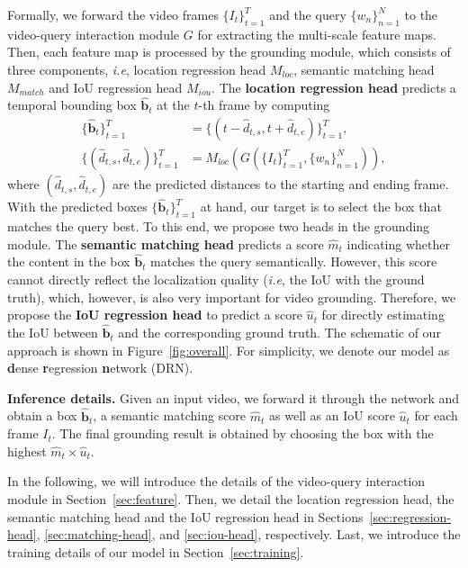 \documentclass[10pt,twocolumn,letterpaper]{article}
\def\ie{\emph{i.e}\onedot} \def\Ie{\emph{I.e}\onedot}
\begin{document}
	
Formally, we forward the video frames $\{I_{t}\}_{t=1}^T$ and the query $\{w_n\}_{n=1}^{N}$ to the video-query interaction module $G$ for extracting the multi-scale feature maps. Then, each  feature map is processed by the grounding module, which consists of three components, \ie, location regression head $M_{loc}$, semantic matching head $M_{match}$ and IoU regression head $M_{iou}$. The \textbf{location regression head} predicts a temporal bounding box $\hat{\mathbf{b}}_{t}$ at the $t$-th frame by computing
	\begin{equation}\label{eq:general}
	\begin{split}
	\{\hat{\mathbf{b}}_{t}\}_{t=1}^T&=\{(t - \hat{d}_{t,s}, t + \hat{d}_{t,e})\}_{t=1}^T, \\
	\{(\hat{d}_{t,s}, \hat{d}_{t,e})\}_{t=1}^{T} 
	& = M_{loc} (G(\{I_{t}\}_{t=1}^T, \{w_n\}_{n=1}^{N})),
	\end{split}
	\end{equation}
	where $(\hat{d}_{t,s}, \hat{d}_{t,e})$ are the predicted distances to the starting and ending frame. With the predicted boxes $\{\hat{\mathbf{b}}_{t}\}_{t=1}^T$ at hand, our target is to select the box that matches the query best. To this end, we propose two heads in the grounding module.
	The \textbf{semantic matching head} predicts a score $\hat{m}_t$ indicating whether the content in the box $\hat{\mathbf{b}}_{t}$ matches the query semantically. However, this score cannot directly reflect the localization quality (\ie, the IoU with the ground truth), which, however, is also very important for video grounding. Therefore, we propose the \textbf{IoU regression head} to predict a score $\hat{u}_t$ for directly estimating the IoU between $\hat{\mathbf{b}}_{t}$ and the corresponding ground truth. 
The schematic of our approach is shown in Figure~\ref{fig:overall}. For simplicity, we denote our model as \textbf{d}ense \textbf{r}egression \textbf{n}etwork (DRN).
	

	\textbf{Inference details.} Given an input video, we 
forward it through the network and obtain a box $\hat{\mathbf{b}}_{t}$, a semantic matching score $\hat{m}_t$ as well as an IoU score $\hat{u}_t$ for each frame $I_{t}$. The final grounding result is obtained by choosing the box with the highest $\hat{m}_t \times \hat{u}_t$.
	
	In the following, we will introduce the details of the video-query interaction module in Section~\ref{sec:feature}. Then, we
	detail the location regression head, the semantic matching head  and the IoU regression head in Sections~\ref{sec:regression-head},  \ref{sec:matching-head}, and \ref{sec:iou-head}, respectively. Last, we introduce the training details of our model in Section~\ref{sec:training}. 
	
\end{document}
